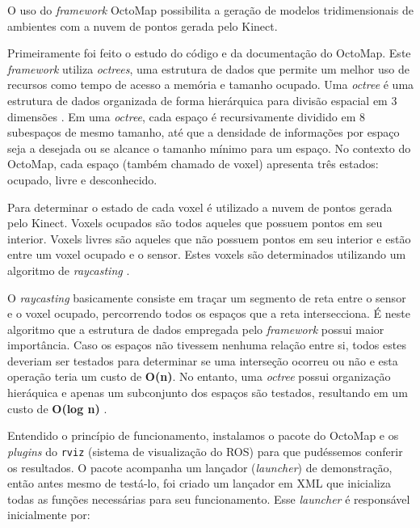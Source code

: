 O uso do \textit{framework} OctoMap possibilita a geração de modelos tridimensionais de ambientes com a nuvem de pontos gerada pelo Kinect.

Primeiramente foi feito o estudo do código e da documentação do OctoMap. Este \textit{framework} utiliza \textit{octrees}, uma estrutura de dados que permite um melhor uso de recursos como tempo de acesso a memória e tamanho ocupado. Uma \textit{octree} é uma estrutura de dados organizada de forma hierárquica para divisão espacial em 3 dimensões \cite{Wilhelms:1992:Octotrees}\cite{Meagher:1981:Octotrees}. Em uma \textit{octree}, cada espaço é recursivamente dividido em 8 subespaços de mesmo tamanho, até que a densidade de informações por espaço seja a desejada ou se alcance o tamanho mínimo para um espaço. No contexto do OctoMap, cada espaço (também chamado de voxel) apresenta três estados: ocupado, livre e desconhecido.

Para determinar o estado de cada voxel é utilizado a nuvem de pontos gerada pelo Kinect. Voxels ocupados são todos aqueles que possuem pontos em seu interior. Voxels livres são aqueles que não possuem pontos em seu interior e estão entre um voxel ocupado e o sensor. Estes voxels são determinados utilizando um algoritmo de \textit{raycasting} \cite{hornung13auro}. 

O \textit{raycasting} basicamente consiste em traçar um segmento de reta entre o sensor e o voxel ocupado, percorrendo todos os espaços que a reta intersecciona. É neste algoritmo que a estrutura de dados empregada pelo \textit{framework} possui maior importância. Caso os espaços não tivessem nenhuma relação entre si, todos estes deveriam ser testados para determinar se uma interseção ocorreu ou não e esta operação teria um custo de \textbf{O(n)}. No entanto, uma \textit{octree} possui organização hieráquica e apenas um subconjunto dos espaços são testados, resultando em um custo de \textbf{O(log n) }\cite{Havran2000:PhD}.

Entendido o princípio de funcionamento, instalamos o pacote do OctoMap e os \textit{plugins} do \verb|rviz| (sistema de visualização do ROS) para que pudéssemos conferir os resultados. O pacote acompanha um lançador (\textit{launcher}) de demonstração, então antes mesmo de testá-lo, foi criado um lançador em XML que inicializa todas as funções necessárias para seu funcionamento. Esse \textit{launcher} é responsável inicialmente por:


